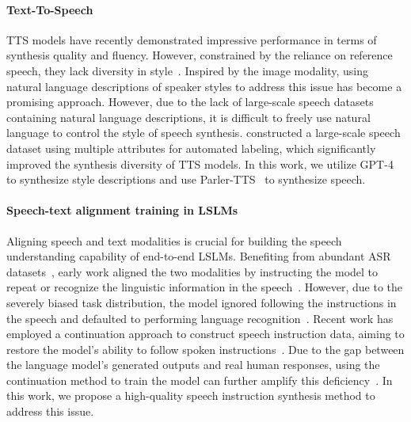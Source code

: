 \documentclass[11pt]{article}
\begin{document}
	\paragraph{Text-To-Speech}
	TTS models have recently demonstrated impressive performance in terms of synthesis quality and fluency.
	However, constrained by the reliance on reference speech, they lack diversity in style~\citep{wang2023neuralcodeclanguagemodels,le2023voiceboxtextguidedmultilingualuniversal}.
	Inspired by the image modality, using natural language descriptions of speaker styles to address this issue has become a promising approach.
	However, due to the lack of large-scale speech datasets containing natural language descriptions, it is difficult to freely use natural language to control the style of speech synthesis. \cite{lyth2024naturallanguageguidancehighfidelity} constructed a large-scale speech dataset using multiple attributes for automated labeling, which significantly improved the synthesis diversity of TTS models.
	In this work, we utilize GPT-4~\citep{openai2024gpt4technicalreport} to synthesize style descriptions and use Parler-TTS~\citep{lacombe-etal-2024-parler-tts} to synthesize speech.
	
	\paragraph{Speech-text alignment training in LSLMs}

	Aligning speech and text modalities is crucial for building the speech understanding capability of end-to-end LSLMs. 
	Benefiting from abundant ASR datasets~\citep{commonvoice:2020,Pratap2020MLSAL,GigaSpeech2021,wang2024globe}, early work aligned the two modalities by instructing the model to repeat or recognize the linguistic information in the speech~\citep{shu2023llasmlargelanguagespeech,zhang2023speechgptempoweringlargelanguage,gong2023jointaudiospeechunderstanding,chu2023qwenaudioadvancinguniversalaudio}.  
	However, due to the severely biased task distribution, the model ignored following the instructions in the speech and defaulted to performing language recognition~\citep{fathullah2024audiochatllamageneralpurposespeechabilities}. 
	Recent work has employed a continuation approach to construct speech instruction data, aiming to restore the model’s ability to follow spoken instructions~\citep{fathullah2024audiochatllamageneralpurposespeechabilities,fang2024llamaomniseamlessspeechinteraction}. 
	Due to the gap between the language model’s generated outputs and real human responses, using the continuation method to train the model can further amplify this deficiency~\citep{seddik2024badtrainingsyntheticdata,chen2024unveilingflawsexploringimperfections}. 
	In this work, we propose a high-quality speech instruction synthesis method to address this issue.
	
\end{document}
